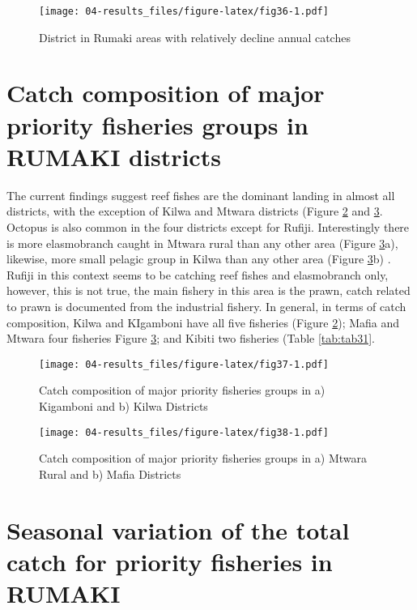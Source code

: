 \documentclass[
  12pt,
  a4paper,
  oneside]{book}
\begin{document}
\begin{figure}
\centering
\texttt{[image: 04-results\_files/figure-latex/fig36-1.pdf]}
\caption{\label{fig:fig36}District in Rumaki areas with relatively decline annual catches}
\end{figure}

\hypertarget{catch-composition-of-major-priority-fisheries-groups-in-rumaki-districts}{%
\section{Catch composition of major priority fisheries groups in RUMAKI districts}\label{catch-composition-of-major-priority-fisheries-groups-in-rumaki-districts}}

The current findings suggest reef fishes are the dominant landing in almost all districts, with the exception of Kilwa and Mtwara districts (Figure \ref{fig:fig37} and \ref{fig:fig38}. Octopus is also common in the four districts except for Rufiji. Interestingly there is more elasmobranch caught in Mtwara rural than any other area (Figure \ref{fig:fig38}a), likewise, more small pelagic group in Kilwa than any other area (Figure \ref{fig:fig38}b) . Rufiji in this context seems to be catching reef fishes and elasmobranch only, however, this is not true, the main fishery in this area is the prawn, catch related to prawn is documented from the industrial fishery. In general, in terms of catch composition, Kilwa and KIgamboni have all five fisheries (Figure \ref{fig:fig37}); Mafia and Mtwara four fisheries Figure \ref{fig:fig38}; and Kibiti two fisheries (Table \ref{tab:tab31}.

\begin{figure}
\centering
\texttt{[image: 04-results\_files/figure-latex/fig37-1.pdf]}
\caption{\label{fig:fig37}Catch composition of major priority fisheries groups in a) Kigamboni and b) Kilwa Districts}
\end{figure}

\begin{figure}
\centering
\texttt{[image: 04-results\_files/figure-latex/fig38-1.pdf]}
\caption{\label{fig:fig38}Catch composition of major priority fisheries groups in a) Mtwara Rural and b) Mafia Districts}
\end{figure}

\hypertarget{seasonal-variation-of-the-total-catch-for-priority-fisheries-in-rumaki}{%
\section{Seasonal variation of the total catch for priority fisheries in RUMAKI}\label{seasonal-variation-of-the-total-catch-for-priority-fisheries-in-rumaki}}
\end{document}

